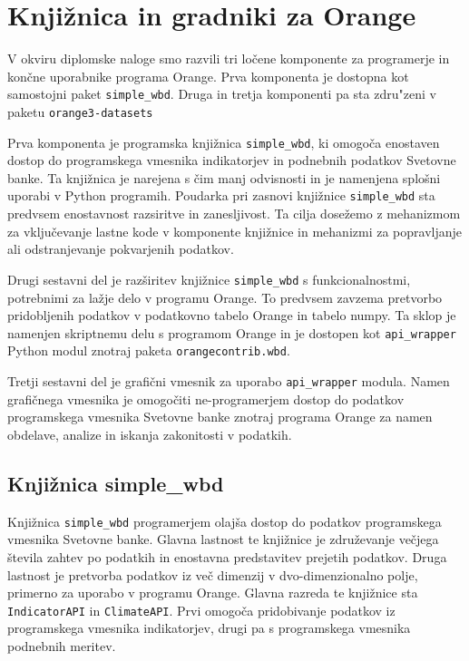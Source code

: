 
\chapter{Knjižnica in gradniki za Orange}

V okviru diplomske naloge smo razvili tri ločene komponente za programerje in
končne uporabnike programa Orange. Prva komponenta je
dostopna kot samostojni paket 
\verb|simple_wbd|. 
Druga in tretja komponenti pa sta zdru"zeni v paketu
\verb|orange3-datasets|

Prva komponenta je programska knjižnica \verb|simple_wbd|, ki
omogoča enostaven dostop do programskega vmesnika indikatorjev in podnebnih
podatkov Svetovne banke. Ta knjižnica je narejena s čim manj odvisnosti in je 
namenjena splošni uporabi v Python programih. Poudarka pri zasnovi knjižnice 
\verb|simple_wbd| sta predvsem enostavnost razsiritve in zanesljivost. Ta cilja
dosežemo z mehanizmom za vključevanje lastne kode v komponente knjižnice
in mehanizmi za popravljanje ali odstranjevanje pokvarjenih podatkov.

Drugi sestavni del je razširitev knjižnice \verb|simple_wbd| s 
funkcionalnostmi, potrebnimi za lažje delo v programu Orange. To predvsem 
zavzema pretvorbo pridobljenih podatkov v podatkovno tabelo Orange in tabelo 
numpy. Ta sklop je namenjen skriptnemu delu s programom Orange 
\cite{orange_scripting} in je dostopen
kot \verb|api_wrapper| Python modul znotraj paketa \verb|orangecontrib.wbd|.

Tretji sestavni del je grafični vmesnik za uporabo \verb|api_wrapper| modula.
Namen grafičnega vmesnika je omogočiti ne-programerjem dostop do podatkov 
programskega vmesnika Svetovne banke znotraj programa Orange za namen obdelave,
analize in iskanja zakonitosti v podatkih.

\section{Knjižnica simple\_wbd}

Knjižnica \verb|simple_wbd| programerjem olajša dostop do podatkov 
programskega vmesnika Svetovne banke. Glavna lastnost te knjižnice je 
združevanje večjega števila zahtev po podatkih in enostavna predstavitev 
prejetih podatkov. Druga lastnost je pretvorba podatkov iz več dimenzij v 
dvo-dimenzionalno polje, primerno za uporabo v programu Orange. Glavna 
razreda te knjižnice sta \verb|IndicatorAPI| in \verb|ClimateAPI|. Prvi 
omogoča pridobivanje podatkov iz programskega vmesnika indikatorjev, drugi pa 
s programskega vmesnika podnebnih meritev.


